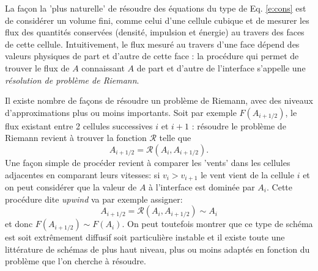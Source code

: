 La façon la 'plus naturelle' de résoudre des équations du type de Eq. \ref{e:cons} est de considérer un volume fini, comme celui d'une cellule cubique et de mesurer les flux des quantités conservées (densité, impulsion et énergie) au travers des faces de cette cellule. Intuitivement, le flux mesuré au travers d'une face dépend des valeurs physiques de part et d'autre de cette face : la procédure qui permet de trouver le flux de $A$ connaissant $A$ de part et d'autre de l'interface s'appelle une \textit{résolution de problème de Riemann}.

 Il existe nombre de façons de résoudre un problème de Riemann, avec des niveaux d'approximations plus ou moins importants. Soit par exemple $F(A_{i+1/2})$, le flux existant entre 2 cellules successives $i$ et $i+1$ : résoudre le problème de Riemann revient à trouver la fonction $\mathcal R$ telle que
 \begin{equation}
 A_{i+1/2}=\mathcal{R}(A_i, A_{i+1/2}).
 \end{equation}
 Une façon simple de procéder revient à comparer les 'vents' dans les cellules adjacentes en comparant leurs vitesses: si $v_i>v_{i+1}$ le vent vient de la cellule $i$ et on peut considérer que la valeur de $A$ à l'interface est dominée par $A_i$. Cette procédure dite \textit{upwind} va par exemple assigner:
  \begin{equation}
 A_{i+1/2}=\mathcal{R}(A_i, A_{i+1/2})\sim A_i
 \end{equation}
 et donc $F(A_{i+1/2})\sim F(A_{i})$. On peut toutefois montrer que ce type de schéma est soit extrêmement diffusif soit particulière instable et il existe toute une littérature de schémas de plus haut niveau, plus ou moins adaptés en fonction du problème que l'on cherche à résoudre.
 
